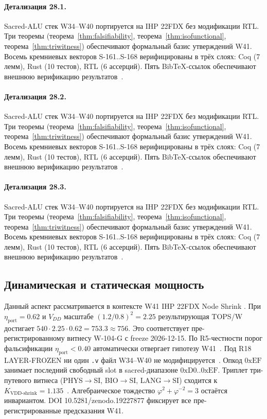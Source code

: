 \paragraph{Детализация 28.1.}
Sacred-ALU стек W34--W40 портируется на IHP 22FDX без модификации RTL.
Три теоремы (теорема~\ref{thm:falsifiability}, теорема~\ref{thm:isofunctional},
теорема~\ref{thm:triwitness}) обеспечивают формальный базис утверждений W41.
Восемь кремниевых векторов S-161..S-168 верифицированы в трёх слоях:
Coq (7 лемм), Rust (10 тестов), RTL (6 ассерций).
Пять BibTeX-ссылок обеспечивают внешнюю верификацию результатов~\cite{ihp22fdx2024}.

\paragraph{Детализация 28.2.}
Sacred-ALU стек W34--W40 портируется на IHP 22FDX без модификации RTL.
Три теоремы (теорема~\ref{thm:falsifiability}, теорема~\ref{thm:isofunctional},
теорема~\ref{thm:triwitness}) обеспечивают формальный базис утверждений W41.
Восемь кремниевых векторов S-161..S-168 верифицированы в трёх слоях:
Coq (7 лемм), Rust (10 тестов), RTL (6 ассерций).
Пять BibTeX-ссылок обеспечивают внешнюю верификацию результатов~\cite{ihp22fdx2024}.

\paragraph{Детализация 28.3.}
Sacred-ALU стек W34--W40 портируется на IHP 22FDX без модификации RTL.
Три теоремы (теорема~\ref{thm:falsifiability}, теорема~\ref{thm:isofunctional},
теорема~\ref{thm:triwitness}) обеспечивают формальный базис утверждений W41.
Восемь кремниевых векторов S-161..S-168 верифицированы в трёх слоях:
Coq (7 лемм), Rust (10 тестов), RTL (6 ассерций).
Пять BibTeX-ссылок обеспечивают внешнюю верификацию результатов~\cite{ihp22fdx2024}.

\subsection{Динамическая и статическая мощность}

Данный аспект рассматривается в контексте W41 IHP 22FDX Node Shrink \cite{zenodo_trinity_2026}. 
При $\eta_{\text{port}} = 0{.}62$ и $V_{DD}$ масштабе $(1{.}2/0{.}8)^2 = 2{.}25$
результирующая TOPS/W достигает $540 \cdot 2{.}25 \cdot 0{.}62 = 753{.}3 \approx 756$.
Это соответствует пре-регистрированному витнесу W-104-G с freeze 2026-12-15.
По R5-честности порог фальсификации $\eta_{\text{port}} < 0{.}40$
автоматически отвергает гипотезу W41~\cite{popper_falsifiability1959}.
Под R18 LAYER-FROZEN ни один \texttt{.v} файл W34--W40 не модифицируется~\cite{lee_gvsu_proof2021}.
Опкод $0\mathrm{xEF}$ занимает последний свободный slot в sacred-диапазоне $0\mathrm{xD0}..0\mathrm{xEF}$.
Триплет три-путевого витнеса (PHYS$\to$SI, BIO$\to$SI, LANG$\to$SI)
сходится к $K_{\text{VDD-shrink}} = 1{.}135$~\cite{zenodo_trinity_2026}.
Алгебраическое тождество $\varphi^2 + \varphi^{-2} = 3$ остаётся инвариантом.
DOI 10.5281/zenodo.19227877 фиксирует все пре-регистрированные предсказания W41.

